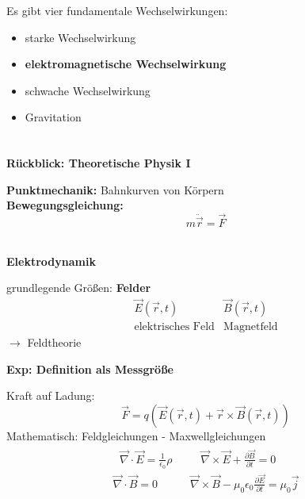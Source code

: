 \documentclass[titlepage,11pt,a4paper,ngerman]{report}
\newcommand{\tx}[1]{\textrm{#1}}
\begin{document}
Es gibt vier fundamentale Wechselwirkungen:
\begin{itemize}
	\item starke Wechselwirkung
	\item \textbf{elektromagnetische Wechselwirkung}
	\item schwache Wechselwirkung
	\item Gravitation
\end{itemize}
$\phantom{0}$\\[5pt]
\begin{Large}
	\textbf{Rückblick: Theoretische Physik I} \\[5pt]
\end{Large}
\textbf{Punktmechanik:} Bahnkurven von Körpern\\
\textbf{Bewegungsgleichung:}
\begin{equation*}
m\ddot{\vec{r}} = \vec{F}
\end{equation*}
\\[5pt]
\begin{Large}
	\textbf{Elektrodynamik} \\[5pt]
\end{Large}
grundlegende Größen: \textbf{Felder}
\begin{equation*}
\begin{array}{cc}
\vec{E}(\vec{r},t) & \vec{B}(\vec{r},t) \\[5pt]
\tx{elektrisches Feld} &  \tx{Magnetfeld}
\end{array}
\end{equation*}
$ \rightarrow $ Feldtheorie\\[10pt]
\begin{large}
	\textbf{Exp: Definition als Messgröße} \\[5pt]
\end{large}
Kraft auf Ladung:
\begin{equation*}
\vec{F} = q (\vec{E}(\vec{r},t) + \vec{r} \times \vec{B}(\vec{r},t))
\end{equation*}
Mathematisch: Feldgleichungen - Maxwellgleichungen
\begin{align}
\begin{array}{ccc}
\ \ \, \vec{\nabla} \cdot \vec{E} = \frac{1}{\epsilon_0} \rho & & \phantom{0,} \vec{\nabla} \times \vec{E} + \frac{\partial \vec{B}}{\partial t} = 0 \\
\vec{\nabla} \cdot \vec{B} = 0 & & \vec{\nabla} \times \vec{B} - \mu_0 \epsilon_0 \frac{\partial \vec{E}}{\partial t} = \mu_0 \vec{j}
\end{array}
\end{align}
\end{document}
